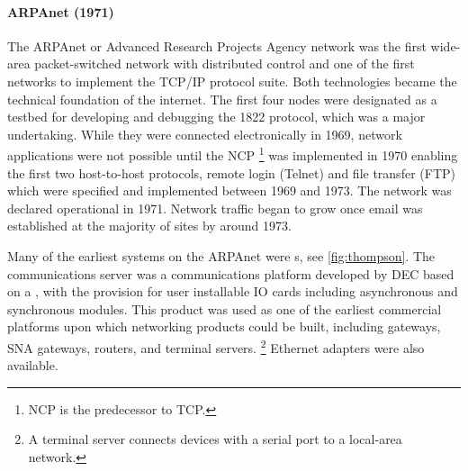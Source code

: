 \paragraph{ARPAnet (1971)}%
The ARPAnet or Advanced Research Projects Agency network was the first wide-area packet-switched network with distributed control and one of the first networks to implement the \acs{TCP}/\acs{IP} protocol suite.
Both technologies became the technical foundation of the internet.
The first four nodes were designated as a testbed for developing and debugging the 1822 protocol, which was a major undertaking.
While they were connected electronically in 1969, network applications were not possible until the \gls{NCP}%
   \footnote{\acs{NCP} is the predecessor to \acs{TCP}.}
was implemented in 1970 enabling the first two host-to-host protocols, remote login (Telnet) and file transfer (\acs{FTP}) which were specified and implemented between 1969 and 1973.
The network was declared operational in 1971.
Network traffic began to grow once email was established at the majority of sites by around 1973.

Many of the earliest systems on the ARPAnet were s, see \vref{fig:thompson}.
The  communications server was a communications platform developed by \gls{DEC} based on a , with the provision for user installable \gls{IO} cards including asynchronous and synchronous modules.
This product was used as one of the earliest commercial platforms upon which networking products could be built, including  gateways, \gls{SNA} gateways, routers, and terminal servers.%
\footnote{A terminal server connects devices with a serial port to a local-area network.}
Ethernet adapters were also available.

